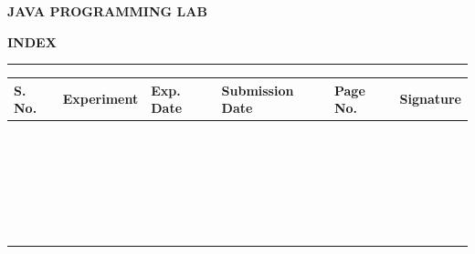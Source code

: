 \documentclass[a4paper,11pt]{article}
\newcommand{\indexheader}{
    \hline
    \rule{0pt}{0.75cm}
    \textbf{S. No.} &
    \centering\textbf{Experiment}\arraybackslash &
    \textbf{Exp. Date} &
    \textbf{Submission Date} &
    \textbf{Page No.} &
    \textbf{Signature}
    \\
    \hline
}
\newcommand{\blankrow}{
    \rule{0pt}{0.72cm} & & & & & \\ \hline
}
\begin{document}

\newpage

\begin{center}

    {\fontsize{24}{28}\selectfont
    \textbf{JAVA PROGRAMMING LAB}}

    \vspace{0.1cm}

    {\fontsize{17}{20}\selectfont
    \textbf{INDEX}}

\end{center}

\vspace{0.15cm}

\hrule height 1.2pt

\vspace{0.35cm}


\begin{tabularx}{\textwidth}{
    |C{0.85cm}
    |L
    |C{1.55cm}
    |C{2.0cm}
    |C{1.25cm}
    |C{1.65cm}|
}

\indexheader

\blankrow
\blankrow
\blankrow
\blankrow
\blankrow

\blankrow
\blankrow
\blankrow
\blankrow
\blankrow

\blankrow
\blankrow
\blankrow
\blankrow
\blankrow

\blankrow
\blankrow
\blankrow
\blankrow
\blankrow

\blankrow
\blankrow
\blankrow
\blankrow
\blankrow

\blankrow

\end{tabularx}
\end{document}
